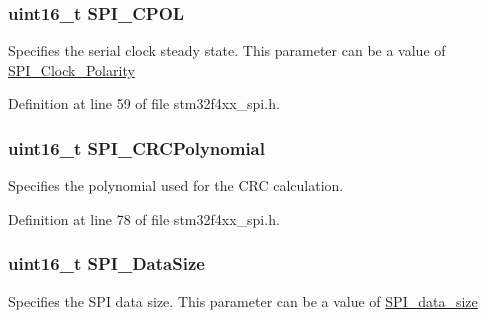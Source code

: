 \hypertarget{struct_s_p_i___init_type_def_ae8d27aca088402c07e34e5a2ab4902d9}{
\subsubsection[{S\-P\-I\-\_\-\-C\-P\-O\-L}]{\setlength{\rightskip}{0pt plus 5cm}uint16\-\_\-t S\-P\-I\-\_\-\-C\-P\-O\-L}}\label{struct_s_p_i___init_type_def_ae8d27aca088402c07e34e5a2ab4902d9}
Specifies the serial clock steady state. This parameter can be a value of \hyperlink{group___s_p_i___clock___polarity}{S\-P\-I\-\_\-\-Clock\-\_\-\-Polarity} 

Definition at line 59 of file stm32f4xx\-\_\-spi.\-h.

\hypertarget{struct_s_p_i___init_type_def_a1f0b3ef1e0062883db3ea3ef5690d0c2}{
\subsubsection[{S\-P\-I\-\_\-\-C\-R\-C\-Polynomial}]{\setlength{\rightskip}{0pt plus 5cm}uint16\-\_\-t S\-P\-I\-\_\-\-C\-R\-C\-Polynomial}}\label{struct_s_p_i___init_type_def_a1f0b3ef1e0062883db3ea3ef5690d0c2}
Specifies the polynomial used for the C\-R\-C calculation. 

Definition at line 78 of file stm32f4xx\-\_\-spi.\-h.

\hypertarget{struct_s_p_i___init_type_def_a541e4cbd533e4102ffeffbe8388a38d6}{
\subsubsection[{S\-P\-I\-\_\-\-Data\-Size}]{\setlength{\rightskip}{0pt plus 5cm}uint16\-\_\-t S\-P\-I\-\_\-\-Data\-Size}}\label{struct_s_p_i___init_type_def_a541e4cbd533e4102ffeffbe8388a38d6}
Specifies the S\-P\-I data size. This parameter can be a value of \hyperlink{group___s_p_i__data__size}{S\-P\-I\-\_\-data\-\_\-size} 

